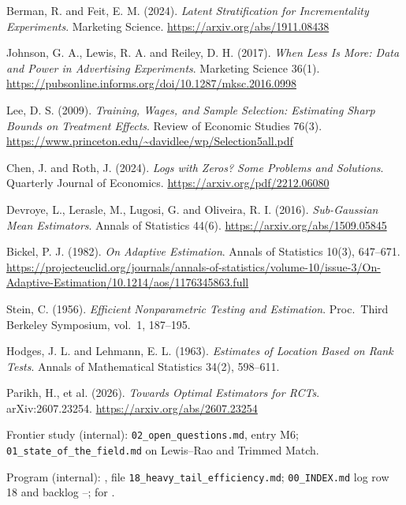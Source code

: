 \begin{enumerate}[label={[\arabic*]},leftmargin=2.5em]
\item Berman, R. and Feit, E. M. (2024). \emph{Latent Stratification for Incrementality Experiments}. Marketing Science. \url{https://arxiv.org/abs/1911.08438}
\item Johnson, G. A., Lewis, R. A. and Reiley, D. H. (2017). \emph{When Less Is More: Data and Power in Advertising Experiments}. Marketing Science 36(1). \url{https://pubsonline.informs.org/doi/10.1287/mksc.2016.0998}
\item Lee, D. S. (2009). \emph{Training, Wages, and Sample Selection: Estimating Sharp Bounds on Treatment Effects}. Review of Economic Studies 76(3). \url{https://www.princeton.edu/~davidlee/wp/Selection5all.pdf}
\item Chen, J. and Roth, J. (2024). \emph{Logs with Zeros? Some Problems and Solutions}. Quarterly Journal of Economics. \url{https://arxiv.org/pdf/2212.06080}
\item Devroye, L., Lerasle, M., Lugosi, G. and Oliveira, R. I. (2016). \emph{Sub-Gaussian Mean Estimators}. Annals of Statistics 44(6). \url{https://arxiv.org/abs/1509.05845}
\item Bickel, P. J. (1982). \emph{On Adaptive Estimation}. Annals of Statistics 10(3), 647--671. \url{https://projecteuclid.org/journals/annals-of-statistics/volume-10/issue-3/On-Adaptive-Estimation/10.1214/aos/1176345863.full}
\item Stein, C. (1956). \emph{Efficient Nonparametric Testing and Estimation}. Proc.\ Third Berkeley Symposium, vol.\ 1, 187--195.
\item Hodges, J. L. and Lehmann, E. L. (1963). \emph{Estimates of Location Based on Rank Tests}. Annals of Mathematical Statistics 34(2), 598--611.
\item Parikh, H., et al. (2026). \emph{Towards Optimal Estimators for RCTs}. arXiv:2607.23254. \url{https://arxiv.org/abs/2607.23254}
\item Frontier study (internal): \texttt{02\_open\_questions.md}, entry M6; \texttt{01\_state\_of\_the\_field.md} on Lewis--Rao and Trimmed Match.
\item Program (internal): , file \texttt{18\_heavy\_tail\_efficiency.md}; \texttt{00\_INDEX.md} log row 18 and backlog --;  for .
\end{enumerate}
\endgroup
